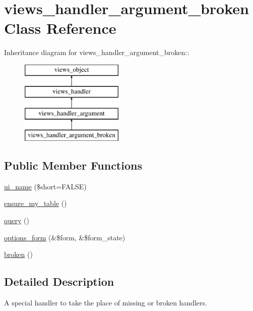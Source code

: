 \hypertarget{classviews__handler__argument__broken}{
\section{views\_\-handler\_\-argument\_\-broken Class Reference}
\label{classviews__handler__argument__broken}
}
Inheritance diagram for views\_\-handler\_\-argument\_\-broken::\begin{figure}[H]
\begin{center}
\leavevmode
\includegraphics[height=4cm]{classviews__handler__argument__broken}
\end{center}
\end{figure}
\subsection*{Public Member Functions}
\begin{CompactItemize}
\item 
\hyperlink{classviews__handler__argument__broken_c62b831ae47250571ae7449906c1687d}{ui\_\-name} (\$short=FALSE)
\item 
\hyperlink{classviews__handler__argument__broken_479772a6b1f448d4edf3ff3eef988733}{ensure\_\-my\_\-table} ()
\item 
\hyperlink{classviews__handler__argument__broken_271044cef8ae5bc6c058ba98ab0fb56d}{query} ()
\item 
\hyperlink{classviews__handler__argument__broken_dc6789177dec1350859832bc7b242454}{options\_\-form} (\&\$form, \&\$form\_\-state)
\item 
\hyperlink{classviews__handler__argument__broken_fb6937305424b7b8a2e6fb9e3d4ef1fb}{broken} ()
\end{CompactItemize}


\subsection{Detailed Description}
A special handler to take the place of missing or broken handlers. 


